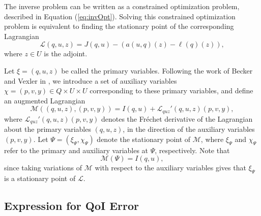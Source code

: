The inverse problem can be written as a constrained optimization problem, described in Equation (\ref{eq:invOpt}). Solving this constrained optimization problem is equivalent to finding the stationary point of the corresponding Lagrangian
\begin{equation}
\mathcal{L}(q,u,z)= J(q,u)-(a(u,q)(z)-\ell(q)(z)),
\end{equation}
where $z\in U$ is the adjoint. 

Let $\xi=(q,u,z)$ be called the primary variables. Following the work of Becker and Vexler in \cite{BecVex05}, we introduce a set of auxiliary variables $\chi=(p,v,y)\in Q\times U\times U$ corresponding to these primary variables, and define an augmented Lagrangian
\begin{equation}
\mathcal{M}((q,u,z),(p,v,y)) = I(q,u) + \mathcal{L}_{quz}'(q,u,z)(p,v,y),
\end{equation}
where $\mathcal{L}_{quz}'(q,u,z)(p,v,y)$ denotes the Fr\'{e}chet derivative of the Lagrangian about the primary variables $(q,u,z)$, in the direction of the auxiliary variables $(p,v,y)$. Let $\Psi = (\xi_\Psi,\chi_\Psi)$ denote the stationary point of $\mathcal{M}$, where $\xi_\Psi$ and $\chi_\Psi$ refer to the primary and auxiliary variables at $\Psi$, respectively. Note that
\begin{equation}
\mathcal{M}(\Psi)=I(q,u),
\label{eq:MeqI}
\end{equation} since taking variations of $\mathcal{M}$ with respect to the auxiliary variables gives that $\xi_\Psi$ is a stationary point of $\mathcal{L}$.

\subsection{Expression for QoI Error} \label{sec:btwnMandadj}

